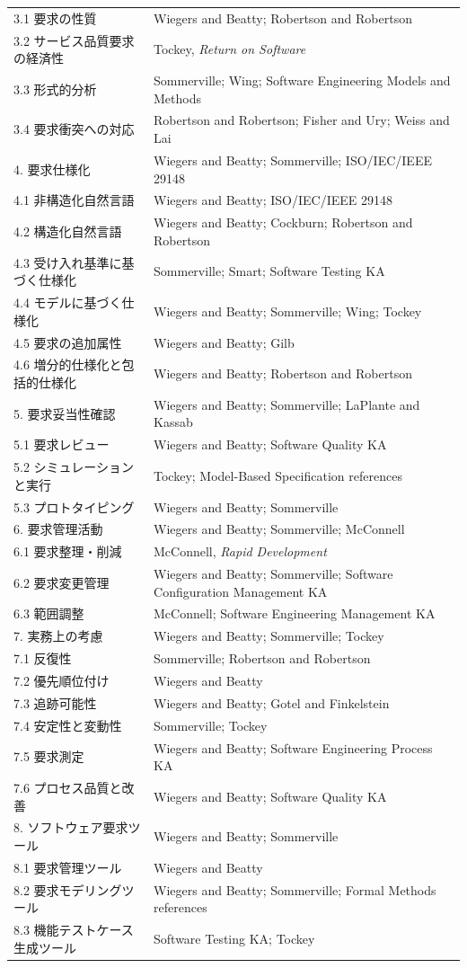 \begin{longtable}{@{}p{.38\linewidth}p{.55\linewidth}@{}}
3.1 要求の性質 & Wiegers and Beatty; Robertson and Robertson \\
3.2 サービス品質要求の経済性 & Tockey, \textit{Return on Software} \\
3.3 形式的分析 & Sommerville; Wing; Software Engineering Models and Methods \\
3.4 要求衝突への対応 & Robertson and Robertson; Fisher and Ury; Weiss and Lai \\
4. 要求仕様化 & Wiegers and Beatty; Sommerville; ISO/IEC/IEEE 29148 \\
4.1 非構造化自然言語 & Wiegers and Beatty; ISO/IEC/IEEE 29148 \\
4.2 構造化自然言語 & Wiegers and Beatty; Cockburn; Robertson and Robertson \\
4.3 受け入れ基準に基づく仕様化 & Sommerville; Smart; Software Testing KA \\
4.4 モデルに基づく仕様化 & Wiegers and Beatty; Sommerville; Wing; Tockey \\
4.5 要求の追加属性 & Wiegers and Beatty; Gilb \\
4.6 増分的仕様化と包括的仕様化 & Wiegers and Beatty; Robertson and Robertson \\
5. 要求妥当性確認 & Wiegers and Beatty; Sommerville; LaPlante and Kassab \\
5.1 要求レビュー & Wiegers and Beatty; Software Quality KA \\
5.2 シミュレーションと実行 & Tockey; Model-Based Specification references \\
5.3 プロトタイピング & Wiegers and Beatty; Sommerville \\
6. 要求管理活動 & Wiegers and Beatty; Sommerville; McConnell \\
6.1 要求整理・削減 & McConnell, \textit{Rapid Development} \\
6.2 要求変更管理 & Wiegers and Beatty; Sommerville; Software Configuration Management KA \\
6.3 範囲調整 & McConnell; Software Engineering Management KA \\
7. 実務上の考慮 & Wiegers and Beatty; Sommerville; Tockey \\
7.1 反復性 & Sommerville; Robertson and Robertson \\
7.2 優先順位付け & Wiegers and Beatty \\
7.3 追跡可能性 & Wiegers and Beatty; Gotel and Finkelstein \\
7.4 安定性と変動性 & Sommerville; Tockey \\
7.5 要求測定 & Wiegers and Beatty; Software Engineering Process KA \\
7.6 プロセス品質と改善 & Wiegers and Beatty; Software Quality KA \\
8. ソフトウェア要求ツール & Wiegers and Beatty; Sommerville \\
8.1 要求管理ツール & Wiegers and Beatty \\
8.2 要求モデリングツール & Wiegers and Beatty; Sommerville; Formal Methods references \\
8.3 機能テストケース生成ツール & Software Testing KA; Tockey \\
\bottomrule
\end{longtable}
\normalsize
